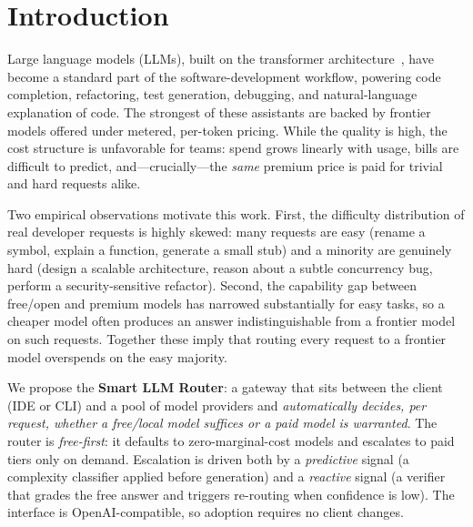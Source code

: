 \documentclass[11pt]{article}
\begin{document}
\section{Introduction}
\label{sec:intro}
Large language models (LLMs), built on the transformer
architecture~\cite{attention}, have become a standard part of the
software-development workflow, powering code completion, refactoring, test
generation, debugging, and natural-language explanation of code. The strongest of these assistants are
backed by frontier models offered under metered, per-token pricing. While the
quality is high, the cost structure is unfavorable for teams: spend grows
linearly with usage, bills are difficult to predict, and---crucially---the
\emph{same} premium price is paid for trivial and hard requests alike.

Two empirical observations motivate this work. First, the difficulty
distribution of real developer requests is highly skewed: many requests are
easy (rename a symbol, explain a function, generate a small stub) and a
minority are genuinely hard (design a scalable architecture, reason about a
subtle concurrency bug, perform a security-sensitive refactor). Second, the
capability gap between free/open and premium models has narrowed substantially
for easy tasks, so a cheaper model often produces an answer indistinguishable
from a frontier model on such requests. Together these imply that routing every
request to a frontier model overspends on the easy majority.

We propose the \textbf{Smart LLM Router}: a gateway that sits between the client
(IDE or CLI) and a pool of model providers and \emph{automatically decides,
per request, whether a free/local model suffices or a paid model is warranted}.
The router is \emph{free-first}: it defaults to zero-marginal-cost models and
escalates to paid tiers only on demand. Escalation is driven both by a
\emph{predictive} signal (a complexity classifier applied before generation)
and a \emph{reactive} signal (a verifier that grades the free answer and
triggers re-routing when confidence is low). The interface is
OpenAI-compatible, so adoption requires no client changes.
\end{document}
